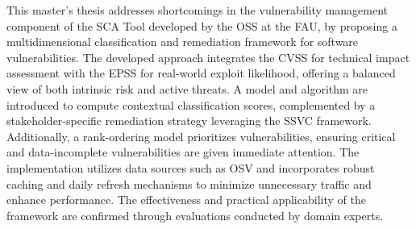 This master's thesis addresses shortcomings in the vulnerability management component of the \ac{SCA} Tool developed by the \ac{OSS} at the \ac{FAU}, by proposing a multidimensional classification and remediation framework for software vulnerabilities. The developed approach integrates the \ac{CVSS} for technical impact assessment with the \ac{EPSS} for real-world exploit likelihood, offering a balanced view of both intrinsic risk and active threats. A model and algorithm are introduced to compute contextual classification scores, complemented by a stakeholder-specific remediation strategy leveraging the \ac{SSVC} framework. Additionally, a rank-ordering model prioritizes vulnerabilities, ensuring critical and data-incomplete vulnerabilities are given immediate attention. The implementation utilizes data sources such as \ac{OSV} and incorporates robust caching and daily refresh mechanisms to minimize unnecessary traffic and enhance performance. The effectiveness and practical applicability of the framework are confirmed through evaluations conducted by domain experts.